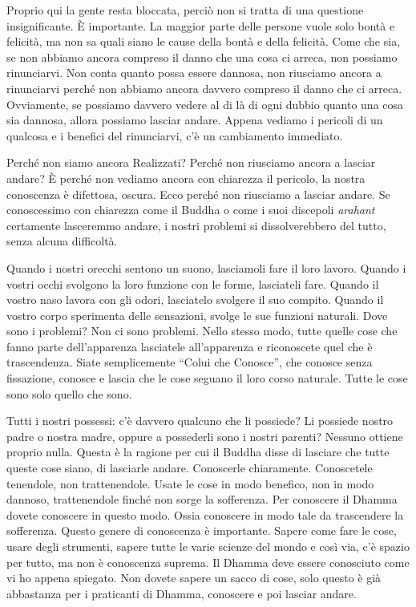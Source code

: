 Proprio qui la gente resta bloccata, perciò non si tratta di una
questione insignificante. È importante. La maggior parte delle persone
vuole solo bontà e felicità, ma non sa quali siano le cause della bontà
e della felicità. Come che sia, se non abbiamo ancora compreso il danno
che una cosa ci arreca, non possiamo rinunciarvi. Non conta quanto possa
essere dannosa, non riusciamo ancora a rinunciarvi perché non abbiamo
ancora davvero compreso il danno che ci arreca. Ovviamente, se possiamo
davvero vedere al di là di ogni dubbio quanto una cosa sia dannosa,
allora possiamo lasciar andare. Appena vediamo i pericoli di un qualcosa
e i benefici del rinunciarvi, c'è un cambiamento immediato.

Perché non siamo ancora Realizzati? Perché non riusciamo ancora a
lasciar andare? È perché non vediamo ancora con chiarezza il pericolo,
la nostra conoscenza è difettosa, oscura. Ecco perché non riusciamo a
lasciar andare. Se conoscessimo con chiarezza come il Buddha o come i
suoi discepoli \emph{arahant} certamente lasceremmo andare, i nostri
problemi si dissolverebbero del tutto, senza alcuna difficoltà.

Quando i nostri orecchi sentono un suono, lasciamoli fare il loro
lavoro. Quando i vostri occhi svolgono la loro funzione con le forme,
lasciateli fare. Quando il vostro naso lavora con gli odori, lasciatelo
svolgere il suo compito. Quando il vostro corpo sperimenta delle
sensazioni, svolge le sue funzioni naturali. Dove sono i problemi? Non
ci sono problemi. Nello stesso modo, tutte quelle cose che fanno parte
dell'apparenza lasciatele all'apparenza e riconoscete quel che è
trascendenza. Siate semplicemente ``Colui che Conosce'', che conosce
senza fissazione, conosce e lascia che le cose seguano il loro corso
naturale. Tutte le cose sono solo quello che sono.

Tutti i nostri possessi: c'è davvero qualcuno che li possiede? Li
possiede nostro padre o nostra madre, oppure a possederli sono i nostri
parenti? Nessuno ottiene proprio nulla. Questa è la ragione per cui il
Buddha disse di lasciare che tutte queste cose siano, di lasciarle
andare. Conoscerle chiaramente. Conoscetele tenendole, non
trattenendole. Usate le cose in modo benefico, non in modo dannoso,
trattenendole finché non sorge la sofferenza. Per conoscere il Dhamma
dovete conoscere in questo modo. Ossia conoscere in modo tale da
trascendere la sofferenza. Questo genere di conoscenza è importante.
Sapere come fare le cose, usare degli strumenti, sapere tutte le varie
scienze del mondo e così via, c'è spazio per tutto, ma non è conoscenza
suprema. Il Dhamma deve essere conosciuto come vi ho appena spiegato.
Non dovete sapere un sacco di cose, solo questo è già abbastanza per i
praticanti di Dhamma, conoscere e poi lasciar andare.

